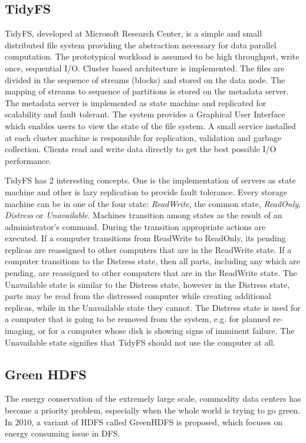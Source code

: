 \documentclass[a4paper,12pt]{article}
\begin{document}
\subsection{TidyFS \cite{tidyfs}}
\label{sec:tidyfs}
TidyFS, developed at Microsoft Research Center, is a simple and small distributed file system providing the abstraction necessary for data parallel computation. The prototypical workload is assumed to be high throughput, write once, sequential I/O. Cluster based architecture is implemented. The files are divided in the sequence of streams (blocks) and stored on the data node. The mapping of streams to sequence of partitions is stored on the metadata server. The metadata server is implemented as state machine and replicated for scalability and fault tolerant. The system provides a Graphical User Interface which enables users to view the state of the file system. A small service installed at each cluster machine is responsible for replication, validation and garbage collection. Clients read and write data directly to get the best possible I/O performance.

TidyFS has 2 interesting concepts. One is the implementation of servers as state machine and other is lazy replication to provide fault tolerance. Every storage machine can be in one of the four state: \textit{ReadWrite}, the common state, \textit{ReadOnly}, \textit{Distress} or \textit{Unavailable}. Machines transition among states as the result of an administrator's command. During the transition appropriate actions are executed. If a computer transitions from ReadWrite to ReadOnly, its pending replicas are reassigned to other computers that are in the ReadWrite state. If a computer transitions to the Distress state, then all parts, including any which are pending, are reassigned to other computers that are in the ReadWrite state. The Unavailable state is similar
to the Distress state, however in the Distress state, parts may be read from the distressed computer while creating additional replicas, while in the Unavailable state they cannot. The Distress state is used for a computer that is going to be removed from the system, e.g. for planned re-imaging, or for a computer whose disk is showing signs of imminent failure. The Unavailable state signifies that TidyFS should not use the computer at all.

\subsection{Green HDFS \cite{zhou}}
\label{sec:ghdfs}
The energy conservation of the extremely large scale, commodity data centers has become a  priority problem, especially when the whole world is trying to go green. In 2010, a variant of HDFS 
called GreenHDFS is proposed, which focuses on energy consuming issue in DFS.
\end{document}
